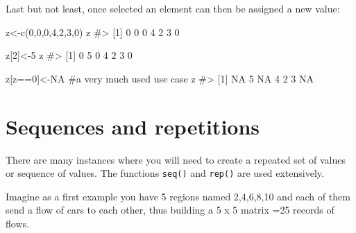 \documentclass[
  letterpaper,
  DIV=11,
  numbers=noendperiod]{scrreprt}
\newenvironment{Shaded}{\begin{snugshade}}{\end{snugshade}}
\newcommand{\CommentTok}[1]{\textcolor[rgb]{0.37,0.37,0.37}{#1}}
\newcommand{\ConstantTok}[1]{\textcolor[rgb]{0.56,0.35,0.01}{#1}}
\newcommand{\DecValTok}[1]{\textcolor[rgb]{0.68,0.00,0.00}{#1}}
\newcommand{\FunctionTok}[1]{\textcolor[rgb]{0.28,0.35,0.67}{#1}}
\newcommand{\NormalTok}[1]{\textcolor[rgb]{0.00,0.23,0.31}{#1}}
\newcommand{\OtherTok}[1]{\textcolor[rgb]{0.00,0.23,0.31}{#1}}
\newcommand{\SpecialCharTok}[1]{\textcolor[rgb]{0.37,0.37,0.37}{#1}}
\begin{document}
Last but not least, once selected an element can then be assigned a new
value:

\begin{Shaded}
\begin{Highlighting}[]
\NormalTok{z}\OtherTok{\textless{}{-}}\FunctionTok{c}\NormalTok{(}\DecValTok{0}\NormalTok{,}\DecValTok{0}\NormalTok{,}\DecValTok{0}\NormalTok{,}\DecValTok{4}\NormalTok{,}\DecValTok{2}\NormalTok{,}\DecValTok{3}\NormalTok{,}\DecValTok{0}\NormalTok{)}
\NormalTok{z}
\CommentTok{\#\textgreater{} [1] 0 0 0 4 2 3 0}

\NormalTok{z[}\DecValTok{2}\NormalTok{]}\OtherTok{\textless{}{-}}\DecValTok{5}
\NormalTok{z}
\CommentTok{\#\textgreater{} [1] 0 5 0 4 2 3 0}

\NormalTok{z[z}\SpecialCharTok{==}\DecValTok{0}\NormalTok{]}\OtherTok{\textless{}{-}}\ConstantTok{NA}  \CommentTok{\#a very much used use case}
\NormalTok{z}
\CommentTok{\#\textgreater{} [1] NA  5 NA  4  2  3 NA}
\end{Highlighting}
\end{Shaded}

\section{Sequences and repetitions}\label{sequences-and-repetitions}

There are many instances where you will need to create a repeated set of
values or sequence of values. The functions \texttt{seq()} and
\texttt{rep()} are used extensively.

Imagine as a first example you have 5 regions named 2,4,6,8,10 and each
of them send a flow of cars to each other, thus building a 5 x 5 matrix
=25 records of flows.
\end{document}
